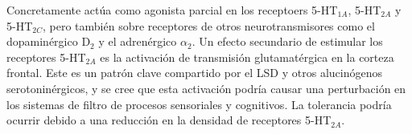 Concretamente actúa como agonista parcial en los receptoers 5-HT$_{1A}$, 5-HT$_{2A}$ y 5-HT$_{2C}$, pero también sobre receptores de otros neurotransmisores como el dopaminérgico D$_2$ y el adrenérgico $\alpha_2$. Un efecto secundario de estimular los receptores 5-HT$_{2A}$ es la activación de transmisión glutamatérgica en la corteza frontal. Este es un patrón clave compartido por el LSD y otros alucinógenos serotoninérgicos, y se cree que esta activación podría causar una perturbación en los sistemas de filtro de procesos sensoriales y cognitivos. La tolerancia podría ocurrir debido a una reducción en la densidad de receptores 5-HT$_{2A}$.

